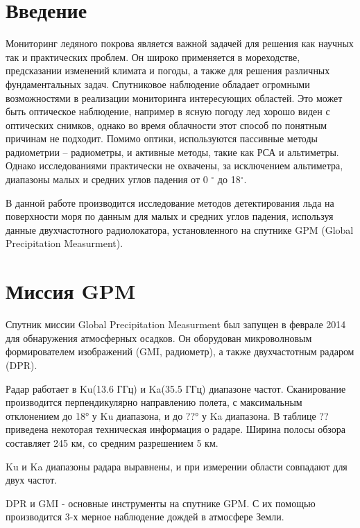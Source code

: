 





\tableofcontents
\newpage
\section*{Введение}

Мониторинг ледяного покрова является важной задачей для решения как научных так и практических проблем. Он широко
применяется в мореходстве, предсказании изменений климата и погоды, а также для решения различных фундаментальных задач.
Спутниковое наблюдение обладает огромными возможностями в реализации мониторинга интересующих областей.
Это может быть оптическое наблюдение, например в ясную погоду лед хорошо виден с оптических снимков, однако во время
облачности этот способ по понятным причинам не подходит. Помимо оптики, используются пассивные методы радиометрии –
радиометры, и активные методы, такие как РСА и альтиметры. Однако исследованиями практически не охвачены, за исключением
альтиметра, диапазоны малых и средних углов падения от 0 $^{\circ}$ до 18$^{\circ}$.

В данной работе производится исследование методов детектирования льда на поверхности моря по данным для малых и средних углов падения,
используя данные двухчастотного радиолокатора, установленного на спутнике GPM (Global Precipitation Measurment).


\section{Миссия GPM}
Спутник миссии Global Precipitation Measurment был запущен в феврале 2014 для обнаружения  атмосферных осадков.
Он оборудован микроволновым формирователем изображений (GMI, радиометр), а также двухчастотным радаром (DPR). 

Радар работает в Ku(13.6 ГГц) и Ka(35.5 ГГц) диапазоне частот. Сканирование производится перпендикулярно направлению
полета, с максимальным отклонением до 18° у Ku диапазона, и до ??° у Ka диапазона. В таблице ?? приведена некоторая
техническая информация о радаре.
Ширина полосы обзора составляет 245 км, со средним разрешением 5 км.

Ku и Ka диапазоны радара выравнены, и при измерении области совпадают для двух частот. 

DPR и GMI - основные инструменты на спутнике GPM. С их помощью производится 3-х мерное наблюдение дождей в атмосфере Земли.   

